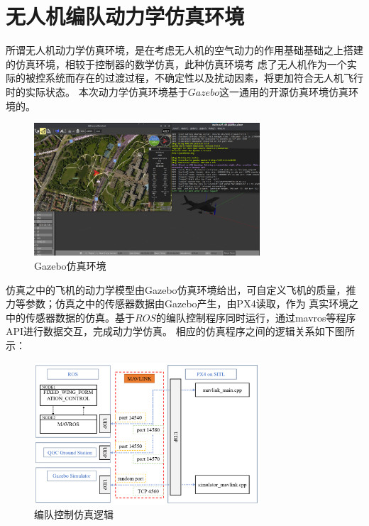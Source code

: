 \section{无人机编队动力学仿真环境}
所谓无人机动力学仿真环境，是在考虑无人机的空气动力的作用基础基础之上搭建的仿真环境，相较于控制器的数学仿真，此种仿真环境考
虑了无人机作为一个实际的被控系统而存在的过渡过程，不确定性以及扰动因素，将更加符合无人机飞行时的实际状态。
本次动力学仿真环境基于$Gazebo$这一通用的开源仿真环境仿真环境的。
\begin{figure}[H]
    \centering
    \includegraphics[width=0.75\textwidth]{figures/c4/Gazebo.png}
    \caption{Gazebo仿真环境}\label{fig:c4-Gazebo}
\end{figure}

仿真之中的飞机的动力学模型由Gazebo仿真环境给出，可自定义飞机的质量，推力等参数；仿真之中的传感器数据由Gazebo产生，由PX4读取，作为
真实环境之中的传感器数据的仿真。基于$ROS$的编队控制程序同时运行，通过mavros等程序API进行数据交互，完成动力学仿真。
相应的仿真程序之间的逻辑关系如下图所示：
\begin{figure}[H]
    \centering
    \includegraphics[width=0.75\textwidth]{figures/c4/px4_sitl_overview.png}
    \caption{编队控制仿真逻辑}\label{fig:px4_sitl_overview}
\end{figure}
